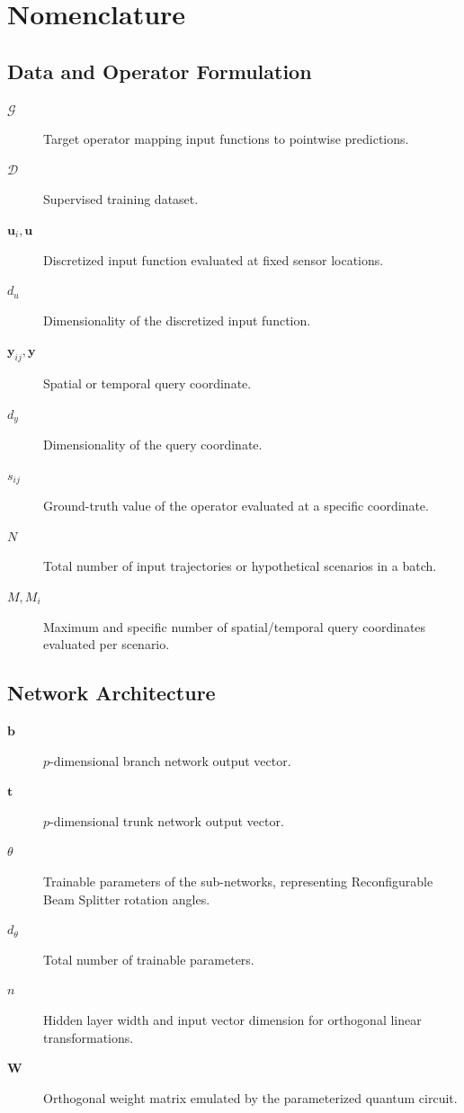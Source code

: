 \documentclass{iopjournal}
\begin{document}
\clearpage
\section{Nomenclature}
\label{sec:nomenclature}
\subsection*{Data and Operator Formulation}
\begin{description}
    \item[$\mathcal{G}$] Target operator mapping input functions to pointwise predictions.
    \item[$\mathcal{D}$] Supervised training dataset.
    \item[$\mathbf{u}_i, \mathbf{u}$] Discretized input function evaluated at fixed sensor locations.
    \item[$d_u$] Dimensionality of the discretized input function.
    \item[$\mathbf{y}_{ij}, \mathbf{y}$] Spatial or temporal query coordinate.
    \item[$d_y$] Dimensionality of the query coordinate.
    \item[$s_{ij}$] Ground-truth value of the operator evaluated at a specific coordinate.
    \item[$N$] Total number of input trajectories or hypothetical scenarios in a batch.
    \item[$M, M_i$] Maximum and specific number of spatial/temporal query coordinates evaluated per scenario.
\end{description}

\subsection*{Network Architecture}
\begin{description}
    \item[$\mathbf{b}$] $p$-dimensional branch network output vector.
    \item[$\mathbf{t}$] $p$-dimensional trunk network output vector.
    \item[$\theta$] Trainable parameters of the sub-networks, representing Reconfigurable Beam Splitter rotation angles.
    \item[$d_\theta$] Total number of trainable parameters.
    \item[$n$] Hidden layer width and input vector dimension for orthogonal linear transformations.
    \item[$\mathbf{W}$] Orthogonal weight matrix emulated by the parameterized quantum circuit.
\end{description}
\end{document}
